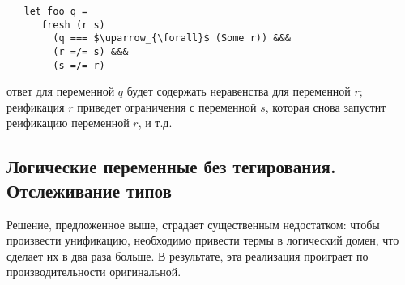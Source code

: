 
\begin{lstlisting}
   let foo q =
      fresh (r s)
        (q === $\uparrow_{\forall}$ (Some r)) &&&
        (r =/= s) &&&
        (s =/= r)
\end{lstlisting}

\noindent ответ для переменной  $q$ будет содержать неравенства для переменной $r$; реификация $r$ приведет ограничения с переменной $s$, которая снова запустит реификацию переменной $r$, и т.д.


%
%

\subsection{Логические переменные без тегирования. Отслеживание типов}

Решение, предложенное выше, страдает существенным недостатком: чтобы произвести унификацию, необходимо привести термы в логический домен, что сделает их в два раза больше. В результате, эта реализация проиграет по производительности оригинальной.



